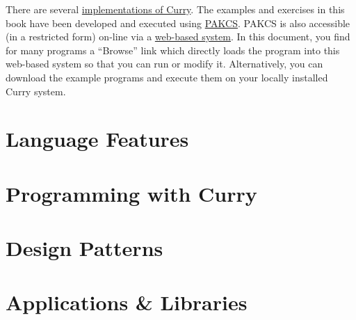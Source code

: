 \documentclass[11pt,fleqn]{report}
\newcommand{\curryurl}{http://www.curry-lang.org}
\newcommand{\pakcs}%
  {\href{http://www.informatik.uni-kiel.de/~pakcs}{{\sc PAKCS}}\xspace}
\begin{document}
There are several
\href{\curryurl/implementations/overview}{implementations of Curry}.
The examples and exercises in this book have been developed
and executed using \pakcs.
PAKCS is also accessible (in a restricted form) on-line via a
\href{http://www-ps.informatik.uni-kiel.de/smap/}{web-based system}.
In this document, you find for many programs a ``Browse'' link
which directly loads the program into this web-based system so that
you can run or modify it.
Alternatively, you can download the example programs
and execute them on your locally installed Curry system.



\part{Language Features}




\part{Programming with Curry}



\part{Design Patterns}


\part{Applications \& Libraries}





\newpage




\newpage
{}
\printindex
\end{document}
